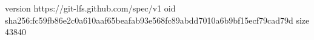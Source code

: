 version https://git-lfs.github.com/spec/v1
oid sha256:fc59fb86e2c0a610aaf65beafab93e568fc89abdd7010a6b9bf15ecf79cad79d
size 43840
